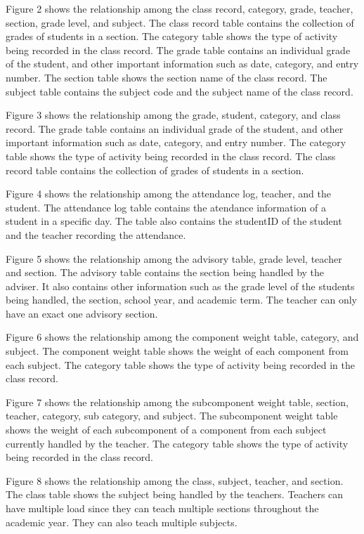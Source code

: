 \documentclass[11pt,a4paper,titlepage]{article}
\begin{document}
Figure 2 shows the relationship among the class record, category, grade, teacher, section, grade level, and subject. The class record table contains the collection of grades of students in a section. The category table shows the type of activity being recorded in the class record. The grade table contains an individual grade of the student, and other important information such as date, category, and entry number. The section table shows the section name of the class record. The subject table contains the subject code and the subject name of the class record.

Figure 3 shows the relationship among the grade, student, category, and class record. The grade table contains an individual grade of the student, and other important information such as date, category, and entry number. The category table shows the type of activity being recorded in the class record. The class record table contains the collection of grades of students in a section.

Figure 4 shows the relationship among the attendance log, teacher, and the student. The attendance log table contains the atendance information of a student in a specific day. The table also contains the studentID of the student and the teacher recording the attendance. 

Figure 5 shows the relationship among the advisory table, grade level, teacher and section. The advisory table contains the section being handled by the adviser. It also contains other information such as the grade level of the students being handled, the section, school year, and academic term. The teacher can only have an exact one advisory section. 

Figure 6 shows the relationship among the component weight table, category, and subject. The component weight table shows the weight of each component from each subject. The category table shows the type of activity being recorded in the class record. 

Figure 7 shows the relationship among the subcomponent weight table, section, teacher, category, sub category, and subject. The subcomponent weight table shows the weight of each subcomponent of a component from each subject currently handled by the teacher. The category table shows the type of activity being recorded in the class record. 

Figure 8 shows the relationship among the class, subject, teacher, and section. The class table shows the subject being handled by the teachers. Teachers can have multiple load since they can teach multiple sections throughout the academic year. They can also teach multiple subjects.
\end{document}
